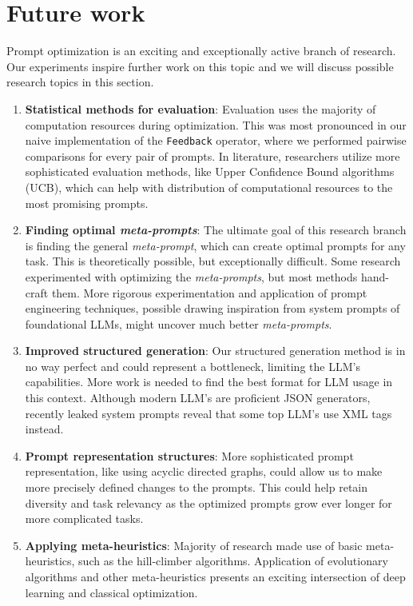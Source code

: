 \section{Future work}
Prompt optimization is an exciting and exceptionally active branch of research. 
Our experiments inspire further work on this topic and we will discuss possible research topics in this section.
\begin{enumerate}
    \item \textbf{Statistical methods for evaluation}: Evaluation uses the majority of computation resources during optimization. This was most pronounced in our naive implementation of the \texttt{Feedback} operator, where we performed pairwise comparisons for every pair of prompts. In literature\cite{pryzant2023automaticpromptoptimizationgradient}\cite{zhang2024sprigimprovinglargelanguage}, researchers utilize more sophisticated evaluation methods, like Upper Confidence Bound algorithms (UCB), which can help with distribution of computational resources to the most promising prompts.
    \item \textbf{Finding optimal \textit{meta-prompts}}: The ultimate goal of this research branch is finding the general \textit{meta-prompt}, which can create optimal prompts for any task. This is theoretically possible\cite{dewynter2024metaprompting}, but exceptionally difficult. Some research\cite{fernando2023promptbreederselfreferentialselfimprovementprompt} experimented with optimizing the \textit{meta-prompts}, but most methods hand-craft them. More rigorous experimentation and application of prompt engineering techniques, possible drawing inspiration from system prompts of foundational LLMs, might uncover much better \textit{meta-prompts}.
    \item \textbf{Improved structured generation}: Our structured generation method is in no way perfect and could represent a bottleneck, limiting the LLM's capabilities. More work is needed to find the best format for LLM usage in this context. Although modern LLM's are proficient JSON generators, recently leaked system prompts reveal that some top LLM's use XML tags instead. 
    \item \textbf{Prompt representation structures}: More sophisticated prompt representation, like using acyclic directed graphs\cite{zhang2024sprigimprovinglargelanguage}, could allow us to make more precisely defined changes to the prompts. This could help retain diversity and task relevancy as the optimized prompts grow ever longer for more complicated tasks.
    \item \textbf{Applying meta-heuristics}: Majority of research made use of basic meta-heuristics, such as the hill-climber algorithms. Application of evolutionary algorithms\cite{guo2024connectinglargelanguagemodels} and other meta-heuristics\cite{pan2024plumpromptlearningusing} presents an exciting intersection of deep learning and classical optimization.

\end{enumerate}
